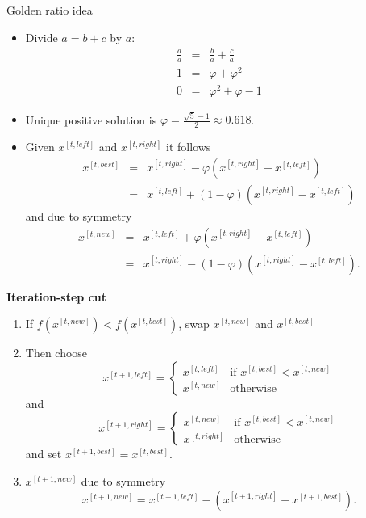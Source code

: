 \documentclass[11pt,compress,t,notes=noshow, xcolor=table]{beamer}
\begin{document}
\begin{vbframe}{Golden ratio idea}
\begin{itemize}
\item Divide $a = b + c$ by $a$:
\begin{eqnarray*}
\frac{a}{a} &=& \frac{b}{a} + \frac{c}{a} \\
1 &=& \varphi + \varphi^2 \\
0 &=& \varphi^2 + \varphi - 1
\end{eqnarray*}
\item Unique positive solution is $\varphi = \frac{\sqrt{5}-1}{2} \approx 0.618$.

\framebreak

\item Given $x^{[t, left]}$ and $x^{[t, right]}$ it follows
\begin{eqnarray*}
x^{[t, best]}&=&x^{[t, right]}-\varphi(x^{[t, right]}-x^{[t, left]})\\
&=&x^{[t, left]}+(1-\varphi)(x^{[t, right]}-x^{[t, left]})
\end{eqnarray*}
and due to symmetry
\begin{eqnarray*}
x^{[t, new]}&=& x^{[t, left]}+\varphi(x^{[t, right]}-x^{[t, left]})\\ &=& x^{[t, right]}-(1-\varphi)(x^{[t, right]}-x^{[t, left]}).
\end{eqnarray*}
\end{itemize}

\framebreak

\textbf{Iteration-step cut} \\
\begin{enumerate}
\item If $f(x^{[t, new]}) < f(x^{[t, best]})$, swap $x^{[t, new]}$ and $x^{[t, best]}$
\item Then choose
$$x^{[t + 1, left]} = \begin{cases}
x^{[t, left]} & \text{if } x^{[t, best]}<x^{[t, new]} \\
x^{[t, new]} & \text{otherwise}
\end{cases}$$
and
$$x^{[t + 1, right]} = \begin{cases}
x^{[t, new]} & \text{if } x^{[t, best]}<x^{[t, new]} \\
x^{[t, right]} & \text{otherwise}
\end{cases}$$
and set $x^{[t + 1, best]}=x^{[t, best]}$.
\item $x^{[t + 1, new]}$ due to symmetry
$$
x^{[t + 1, new]}=x^{[t + 1, left]}-(x^{[t + 1, right]}-x^{[t + 1, best]}).
$$
\end{enumerate}
%

\end{vbframe}
\end{document}
